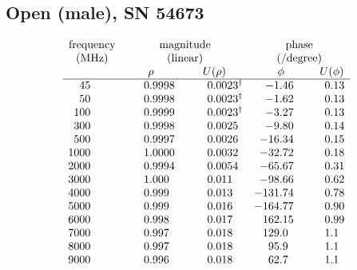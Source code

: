 \documentclass[IANZ]{MSLCalCert}
\begin{document}
\subsection{Open (male), SN 54673}

 \begin{center} %
 
 \begin{singlespace}
 
 	\small	%
 
  	\setlength{\extrarowheight}{3pt}
  
	\[
  		\begin{array}{SSSSS}
    		\multicolumn{1}{c}{ \text{frequency} } & 
    		\multicolumn{2}{c}{ \text{magnitude} } &
    		\multicolumn{2}{c}{ \text{phase} } 
    		\\
    		\multicolumn{1}{c}{ \si{(MHz)} } &  
    		\multicolumn{2}{c}{ (\text{linear}) } &
    		\multicolumn{2}{c}{ \text{(/degree)} }  
    		\\
     		& {\rho} & {U(\rho)} & {\phi} & {U(\phi)} 
     		\\ \hline %

		45 &   0.9998 &   0.0023$^\dagger$ &    -1.46 &     0.13     \\
		50 &   0.9998 &   0.0023$^\dagger$ &    -1.62 &     0.13     \\
		100 &   0.9999 &   0.0023$^\dagger$ &    -3.27 &     0.13    \\
		300 &   0.9998 &   0.0025 &    -9.80 &     0.14    \\
		500 &   0.9997 &   0.0026 &   -16.34 &     0.15    \\
		1000 &   1.0000 &   0.0032 &   -32.72 &     0.18   \\
		2000 &   0.9994 &   0.0054 &   -65.67 &     0.31  \\
		3000 &    1.000 &    0.011 &   -98.66 &     0.62   \\
		4000 &    0.999 &    0.013 &  -131.74 &     0.78   \\
		5000 &    0.999 &    0.016 &  -164.77 &     0.90   \\
		6000 &    0.998 &    0.017 &  +162.15 &     0.99   \\
		7000 &    0.997 &    0.018 &   +129.0 &      1.1   \\
		8000 &    0.997 &    0.018 &    +95.9 &      1.1   \\
		9000 &    0.996 &    0.018 &    +62.7 &      1.1  \\
		

\end{array}\]
\end{singlespace}
\end{center}
\end{document}
